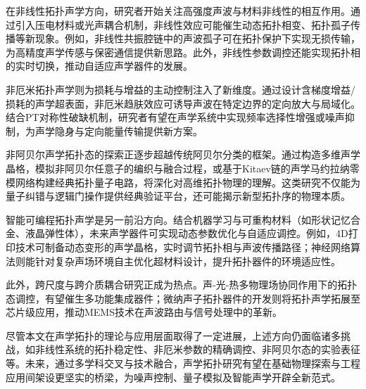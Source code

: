 在非线性拓扑声学方向，研究者开始关注高强度声波与材料非线性的相互作用。通过引入压电材料或光声耦合机制，非线性效应可能催生动态拓扑相变、拓扑孤子传播等新现象。例如，非线性共振腔链中的声波孤子可在拓扑保护下实现无损传输，为高精度声学传感与保密通信提供新思路。此外，非线性参数调控还能实现拓扑相的实时切换，推动自适应声学器件的发展。

非厄米拓扑声学则为损耗与增益的主动控制注入了新维度。通过设计含梯度增益/损耗的声学超表面，非厄米趋肤效应可诱导声波在特定边界的定向放大与局域化。结合PT对称性破缺机制，研究者有望在声学系统中实现频率选择性增强或噪声抑制，为声学隐身与定向能量传输提供新方案。

非阿贝尔声学拓扑态的探索正逐步超越传统阿贝尔分类的框架。通过构造多维声学晶格，模拟非阿贝尔任意子的编织与融合过程，或基于Kitaev链的声学马约拉纳零模网络构建经典拓扑量子电路，将深化对高维拓扑物理的理解。这类研究不仅能为量子纠错与逻辑门操作提供经典验证平台，还可能揭示新型拓扑序的物理本质。

智能可编程拓扑声学是另一前沿方向。结合机器学习与可重构材料（如形状记忆合金、液晶弹性体），未来声学器件可实现动态参数优化与自适应调控。例如，4D打印技术可制备动态变形的声学晶格，实时调节拓扑相与声波传播路径；神经网络算法则能针对复杂声场环境自主优化超材料设计，提升拓扑器件的环境适应性。

此外，跨尺度与跨介质耦合研究正成为热点。声-光-热多物理场协同作用下的拓扑态调控，有望催生多功能集成器件；微纳声子拓扑器件的开发则将拓扑声学拓展至芯片级应用，推动MEMS技术在声波路由与信号处理中的革新。

尽管本文在声学拓扑的理论与应用层面取得了一定进展，上述方向仍面临诸多挑战，如非线性系统的拓扑稳定性、非厄米参数的精确调控、非阿贝尔态的实验表征等。未来，通过多学科交叉与技术融合，声学拓扑研究有望在基础物理探索与工程应用间架设更坚实的桥梁，为噪声控制、量子模拟及智能声学开辟全新范式。